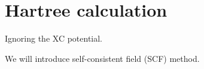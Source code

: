 \section{Hartree calculation}

Ignoring the XC potential.

We will introduce self-consistent field (SCF) method.